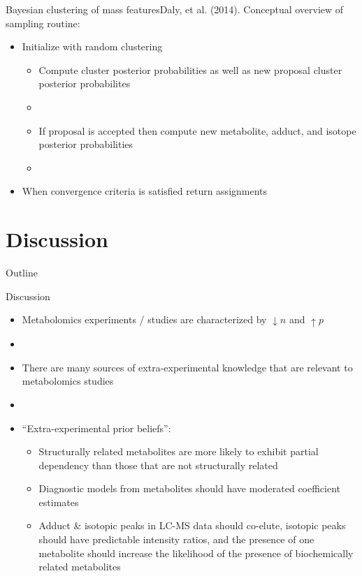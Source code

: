 \documentclass[xcolor=dvipsnames]{beamer}
\begin{document}
\begin{frame}{Bayesian clustering of mass features}{Daly, et al. (2014).}
	\vspace{-12pt}
	Conceptual overview of sampling routine:
	
	\begin{itemize}
		\item Initialize with random clustering
		\begin{itemize}
					\item Compute cluster posterior probabilities as well as new proposal cluster posterior probabilites
					\item[]
					\item If proposal is accepted then compute new metabolite, adduct, and isotope posterior probabilities
					\item[]
		\end{itemize}
		\item When convergence criteria is satisfied return assignments 
	\end{itemize}
\end{frame}

\section{Discussion}

\begin{frame}{Outline}
	\vspace{-10.5pt}
	\tableofcontents[currentsection,subsectionstyle=hide]
\end{frame}

\begin{frame}{Discussion}
	\vspace{-10.5pt}
	\begin{itemize}
		\item Metabolomics experiments / studies are characterized by $\downarrow n$ and $\uparrow p$ \pause
		\item[]
		\item There are many sources of extra-experimental knowledge that are relevant to metabolomics studies \pause
		\item[] 
		\item ``Extra-experimental prior beliefs'': \pause
		\begin{itemize}
			\item Structurally related metabolites are more likely to exhibit partial dependency than those that are not structurally related \pause
			\item Diagnostic models from metabolites should have moderated coefficient estimates \pause
			\item Adduct \& isotopic peaks in LC-MS data should co-elute, isotopic peaks should have predictable intensity ratios, and the presence of one metabolite should increase the likelihood of the presence of biochemically related metabolites
		\end{itemize}
	\end{itemize}
\end{frame}
\end{document}

